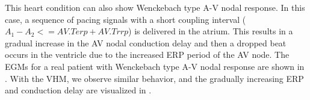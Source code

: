 \begin{figure}[!t]
\centering
		\hspace{.1in}%
\vspace{-5pt}
\caption{}
\vspace{-15pt}
\end{figure} 
This heart condition can also show Wenckebach type A-V nodal response. In this case, a sequence of pacing signals with a short coupling interval ($A_1-A_2<=AV.Terp+AV.Trrp$) is delivered in the atrium. This results in a gradual increase in the AV nodal conduction delay and then a dropped beat occurs in the ventricle due to the increased ERP period of the AV node. The EGMs for a real patient with Wenckebach type A-V nodal response are shown in . With the VHM, we observe similar behavior, and the gradually increasing ERP and conduction delay are visualized in .
